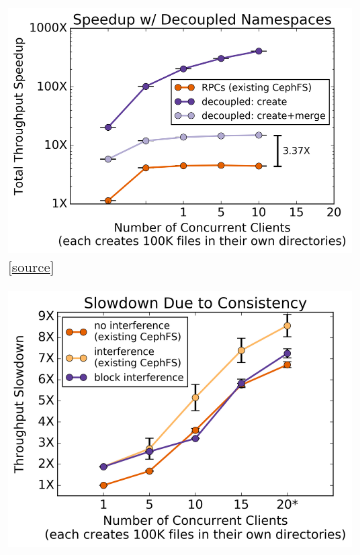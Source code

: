 
\begin{figure}[tb]
  \centering
  \begin{subfigure}[b]{.3\linewidth}
      \centering
      \includegraphics[width=1.0\linewidth]{graphs/mergescale.png}
      \caption{
      [\href{https://github.com/michaelsevilla/cudele-popper/blob/revision/experiments/cudele-mergescale/visualize/viz.ipynb}{source}]
      }\label{fig:mergescale}
  \end{subfigure}
  \begin{subfigure}[b]{.3\linewidth}
      \centering
      \includegraphics[width=1.0\linewidth]{graphs/block-allow.png}

\end{subfigure}
\end{figure}
